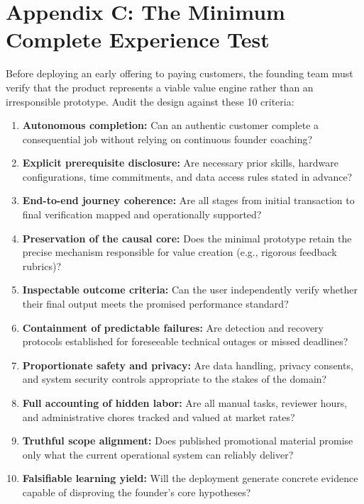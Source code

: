 \section*{Appendix C: The Minimum Complete Experience Test}

Before deploying an early offering to paying customers, the founding team must verify that the product represents a viable value engine rather than an irresponsible prototype. Audit the design against these 10 criteria:

\begin{enumerate}[leftmargin=*]
\item \textbf{Autonomous completion:} Can an authentic customer complete a consequential job without relying on continuous founder coaching?
\item \textbf{Explicit prerequisite disclosure:} Are necessary prior skills, hardware configurations, time commitments, and data access rules stated in advance?
\item \textbf{End-to-end journey coherence:} Are all stages from initial transaction to final verification mapped and operationally supported?
\item \textbf{Preservation of the causal core:} Does the minimal prototype retain the precise mechanism responsible for value creation (e.g., rigorous feedback rubrics)?
\item \textbf{Inspectable outcome criteria:} Can the user independently verify whether their final output meets the promised performance standard?
\item \textbf{Containment of predictable failures:} Are detection and recovery protocols established for foreseeable technical outages or missed deadlines?
\item \textbf{Proportionate safety and privacy:} Are data handling, privacy consents, and system security controls appropriate to the stakes of the domain?
\item \textbf{Full accounting of hidden labor:} Are all manual tasks, reviewer hours, and administrative chores tracked and valued at market rates?
\item \textbf{Truthful scope alignment:} Does published promotional material promise only what the current operational system can reliably deliver?
\item \textbf{Falsifiable learning yield:} Will the deployment generate concrete evidence capable of disproving the founder's core hypotheses?
\end{enumerate}

